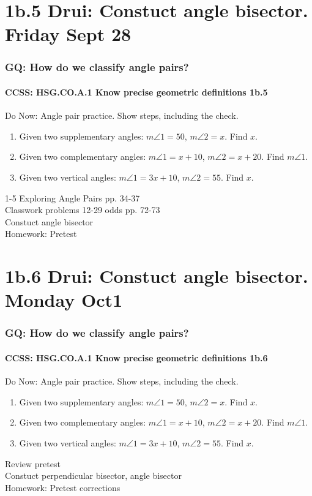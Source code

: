 \documentclass{beamer}
\begin{document}
\section{1b.5 Drui: Constuct angle bisector. Friday Sept 28}
  \frame
  {
    \frametitle{GQ: How do we classify angle pairs?}
    \framesubtitle{CCSS: HSG.CO.A.1 Know precise geometric definitions  \alert{1b.5}}

    \begin{block}{Do Now: Angle pair practice. Show steps, including the check.}
      \begin{enumerate}
          \item Given two supplementary angles: $m \angle 1 = 50$, $m \angle 2 = x$. Find $x$.
          \item Given two complementary angles: $m \angle 1 = x+10$, $m \angle 2 = x+20$. Find $m \angle 1$.
          \item Given two vertical angles: $m \angle 1 = 3x+10$, $m \angle 2 = 55$. Find $x$.
      \end{enumerate}
    \end{block}
    1-5 Exploring Angle Pairs pp. 34-37\\
    Classwork problems 12-29 odds pp. 72-73\\
    Constuct angle bisector \\
    \vspace{0.5cm}
    Homework: Pretest
  }

\section{1b.6 Drui: Constuct angle bisector. Monday Oct1}
  \frame
  {
    \frametitle{GQ: How do we classify angle pairs?}
    \framesubtitle{CCSS: HSG.CO.A.1 Know precise geometric definitions  \alert{1b.6}}

    \begin{block}{Do Now: Angle pair practice. Show steps, including the check.}
      \begin{enumerate}
          \item Given two supplementary angles: $m \angle 1 = 50$, $m \angle 2 = x$. Find $x$.
          \item Given two complementary angles: $m \angle 1 = x+10$, $m \angle 2 = x+20$. Find $m \angle 1$.
          \item Given two vertical angles: $m \angle 1 = 3x+10$, $m \angle 2 = 55$. Find $x$.
      \end{enumerate}
    \end{block}
    Review pretest\\
    Constuct perpendicular bisector, angle bisector\\
    \vspace{0.5cm}
    Homework: Pretest corrections
  }
\end{document}
